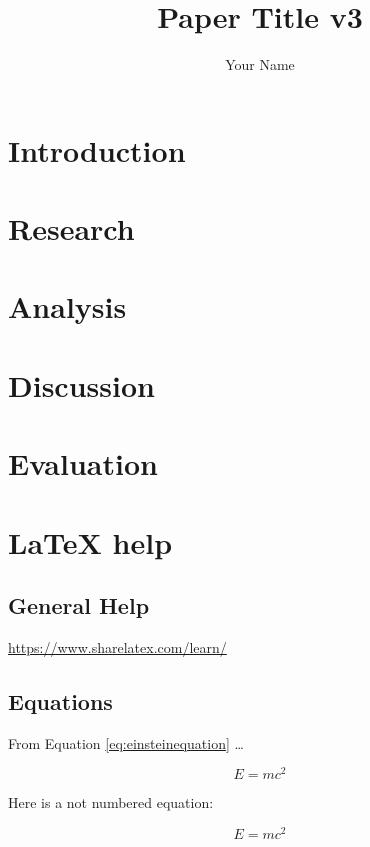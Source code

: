 \documentclass[11pt,a4paper,titlepage]{article}
\title{Paper Title v3}
\author{Your Name}
\begin{document}
\maketitle


\clearpage

\tableofcontents

\clearpage


\section{Introduction}
\section{Research}
\section{Analysis}
\section{Discussion}
\section{Evaluation}

\section{\LaTeX{} help}

\subsection{General Help}

\url{https://www.sharelatex.com/learn/}


\subsection{Equations}

From Equation \eqref{eq:einsteinequation} \ldots


\begin{equation}
\label{eq:einsteinequation}
E = m c^2
\end{equation}

Here is a not numbered equation:

\begin{equation*}
\label{eq:einsteinequation*}
E = m c^2
\end{equation*}
\end{document}
